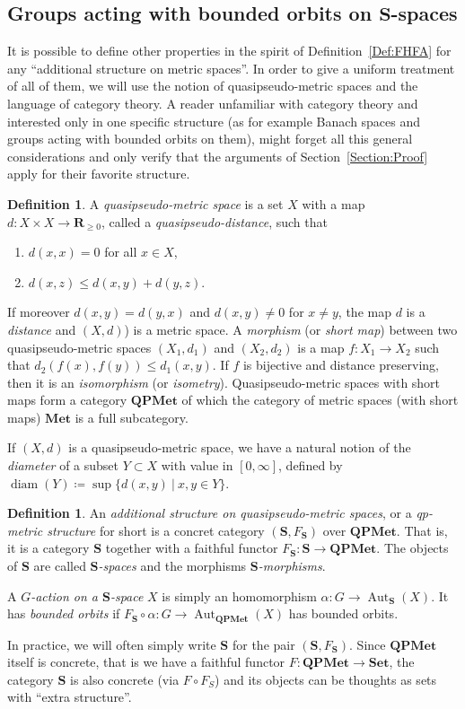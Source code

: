 \documentclass[a4paper]{article}
\theoremstyle{definition}
\newtheorem{defn}[lem]{Definition}
\DeclareMathOperator\Aut{Aut}
\DeclareMathOperator\diam{diam}
\newcommand*{\field}[1]{\mathbf{#1}}
\newcommand*{\R}{\field{R}}
\newcommand{\setst}[2]{\{#1\ |\ #2\}}
\begin{document}
\subsection{Groups acting with bounded orbits on \texorpdfstring{$\mathbf S$}{\textbf{S}}-spaces}
It is possible to define other properties in the spirit of Definition~\ref{Def:FHFA} for any ``additional structure on metric spaces''.
In order to give a uniform treatment of all of them, we will use the notion of quasipseudo-metric spaces and the language of category theory.
A reader unfamiliar with category theory and interested only in one specific structure (as for example Banach spaces and groups acting with bounded orbits on them), might forget all this general considerations and only verify that the arguments of Section~\ref{Section:Proof} apply for their favorite structure.
%
%
\begin{defn}
A \emph{quasipseudo-metric space} is a set $X$ with a map $d\colon X\times X\to \R_{\geq0}$, called a \emph{quasipseudo-distance}, such that
\begin{enumerate}
\item $d(x,x)=0$ for all $x\in X$,
\item $d(x,z)\leq d(x,y)+d(y,z)$.
\end{enumerate}
\end{defn}
%
%
If moreover $d(x,y)=d(y,x)$ and $d(x,y)\neq 0$ for $x\neq y$, the map $d$ is a \emph{distance} and $(X,d)$) is a metric space.
A \emph{morphism} (or \emph{short map}) between two quasipseudo-metric spaces $(X_1,d_1)$ and $(X_2,d_2)$ is a map $f\colon X_1\to X_2$ such that $d_2(f(x),f(y))\leq d_1(x,y)$.
If $f$ is bijective and distance preserving, then it is an \emph{isomorphism} (or \emph{isometry}).
Quasipseudo-metric spaces with short maps form a category $\mathbf{QPMet}$ of which the category of metric spaces (with short maps) $\mathbf{Met}$ is a full subcategory.

If $(X,d)$ is a quasipseudo-metric space, we have a natural notion of the  \emph{diameter} of a subset $Y\subset X$ with value in $[0,\infty]$, defined by $\diam(Y)\coloneqq\sup\setst{d(x,y)}{x,y\in Y}$.
%
%
\begin{defn}\label{Def:Categoric}
An \emph{additional structure on quasipseudo-metric spaces}, or a \emph{qp-metric structure} for short is a concret category $(\mathbf S,F_{\mathbf S})$ over $\mathbf{QPMet}$.
That is, it is a category $\mathbf{S}$ together with a faithful functor $F_{\mathbf S}\colon \mathbf{S}\to \mathbf{QPMet}$.
The objects of $\mathbf{S}$ are called \emph{$\mathbf S$-spaces} and the morphisms \emph{$\mathbf S$-morphisms}.

A \emph{$G$-action on a $\mathbf S$-space} $X$ is simply an homomorphism $\alpha\colon G\to\Aut_{\mathbf{S}}(X)$. It has \emph{bounded orbits} if $F_{\mathbf S}\circ \alpha\colon G\to \Aut_{\mathbf{QPMet}}(X)$ has bounded orbits.
\end{defn}
%
%
In practice, we will often simply write $\mathbf{S}$  for the pair $(\mathbf{S},F_{\mathbf{S}})$.
Since $\mathbf{QPMet}$ itself is concrete, that is we have a faithful functor $F\colon \mathbf{QPMet}\to\mathbf{Set}$, the category $\mathbf{S}$ is also concrete (via $F\circ F_S$) and its objects can be thoughts as sets with ``extra structure''.
\end{document}
